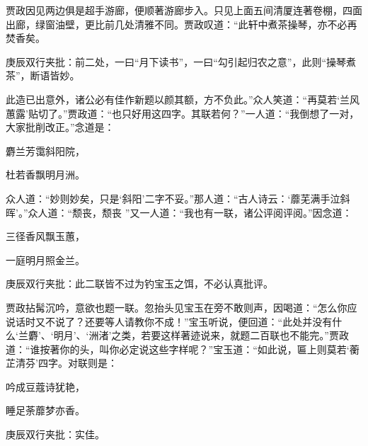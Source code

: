\begin{parag}


    贾政因见两边俱是超手游廊，便顺著游廊步入。只见上面五间清厦连著卷棚，四面出廊，绿窗油壁，更比前几处清雅不同。贾政叹道：“此轩中煮茶操琴，亦不必再焚香矣。\begin{note}庚辰双行夹批：前二处，一曰“月下读书”，一曰“勾引起归农之意”，此则“操琴煮茶”，断语皆妙。\end{note}此造已出意外，诸公必有佳作新题以颜其额，方不负此。”众人笑道：“再莫若‘兰风蕙露’贴切了。”贾政道：“也只好用这四字。其联若何？”一人道：“我倒想了一对，大家批削改正。”念道是：
\end{parag}

\begin{poem}
    \begin{pl}    麝兰芳霭斜阳院，\end{pl}

    \begin{pl}    杜若香飘明月洲。\end{pl}
\end{poem}
\begin{parag}

    众人道：“妙则妙矣，只是‘斜阳’二字不妥。”那人道：“古人诗云：‘蘼芜满手泣斜晖’。”众人道：“颓丧，颓丧 ”又一人道：“我也有一联，诸公评阅评阅。”因念道：
\end{parag}
\begin{poem}
    \begin{pl}三径香风飘玉蕙，\end{pl}

    \begin{pl}一庭明月照金兰。\end{pl}
    \begin{note}庚辰双行夹批：此二联皆不过为钓宝玉之饵，不必认真批评。\end{note}
\end{poem}
\begin{parag}

    贾政拈髯沉吟，意欲也题一联。忽抬头见宝玉在旁不敢则声，因喝道：“怎么你应说话时又不说了？还要等人请教你不成！”宝玉听说，便回道：“此处并没有什么‘兰麝’、‘明月’、‘洲渚’之类，若要这样著迹说来，就题二百联也不能完。”贾政道：“谁按著你的头，叫你必定说这些字样呢？”宝玉道：“如此说，匾上则莫若‘蘅芷清芬’四字。对联则是：
\end{parag}
\begin{poem}
    \begin{pl}吟成豆蔻诗犹艳，\end{pl}
    \begin{pl}睡足荼蘼梦亦香。\end{pl}\begin{note}庚辰双行夹批：实佳。\end{note}
\end{poem}

